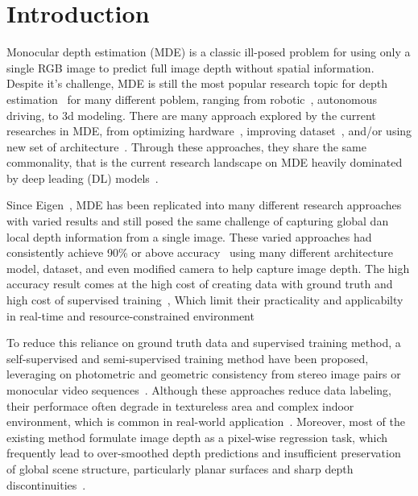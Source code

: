 \documentclass[journal,article,submit,pdftex,moreauthors]{Definitions/mdpi}
\begin{document}
\section{Introduction}
Monocular depth estimation (MDE) is a classic ill\mbox{-}posed problem for using only a single RGB image to predict full image depth without spatial information.
Despite it's challenge, MDE is still the most popular research topic for depth estimation~\cite{guizilini9156708} for many different poblem, 
ranging from robotic~\cite{chang9010976}, autonomous driving, to 3d modeling.
There are many approach explored by the current researches in MDE, from optimizing hardware~\cite{chang9010976}, improving dataset~\cite{guizilini9156708}, and/or using new set of architecture~\cite{guizilini9156708,hendra10113647}.
Through these approaches, they share the same commonality, that is the current research landscape on MDE heavily dominated by deep leading (DL) models~\cite{masomians22145353}.

Since Eigen~\cite{eigen14062283}, MDE has been replicated into many different research approaches with varied results and still posed the same challenge of capturing global dan local depth information from a single image.
These varied approaches had consistently achieve 90\% or above accuracy~\cite{khan20082272} using many different architecture model, dataset, and even modified camera to help capture image depth.
The high accuracy result comes at the high cost of creating data with ground truth and high cost of supervised training~\cite{zhao101007,masomians22145353,khan20082272},
Which limit their practicality and applicabilty in real-time and resource-constrained environment~\cite{zhao101007,khan20082272}

To reduce this reliance on ground truth data and supervised training method, a self-supervised and semi-supervised training method have been proposed,
leveraging on photometric and geometric consistency from stereo image pairs or monocular video sequences~\cite{Zhou2017Unsupervised,Godard2017Monodepth}.
Although these approaches reduce data labeling, their performace often degrade in textureless area and complex indoor environment, which is common in real-world application~\cite{masomians22145353}.
Moreover, most of the existing method formulate image depth as a pixel-wise regression task, which frequently lead to over-smoothed depth predictions and insufficient preservation of global scene structure, 
particularly planar surfaces and sharp depth discontinuities~\cite{khan20082272}.
\end{document}
